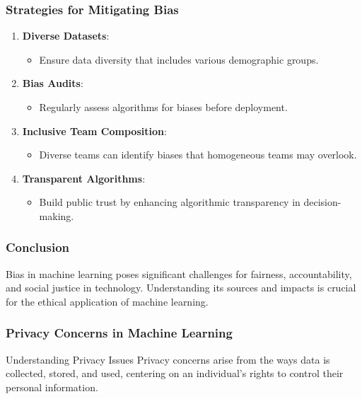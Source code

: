 \documentclass[aspectratio=169]{beamer}
\begin{document}
\begin{frame}[fragile]
    \frametitle{Strategies for Mitigating Bias}
    \begin{enumerate}
        \item \textbf{Diverse Datasets}:
        \begin{itemize}
            \item Ensure data diversity that includes various demographic groups.
        \end{itemize}

        \item \textbf{Bias Audits}:
        \begin{itemize}
            \item Regularly assess algorithms for biases before deployment.
        \end{itemize}

        \item \textbf{Inclusive Team Composition}:
        \begin{itemize}
            \item Diverse teams can identify biases that homogeneous teams may overlook.
        \end{itemize}

        \item \textbf{Transparent Algorithms}:
        \begin{itemize}
            \item Build public trust by enhancing algorithmic transparency in decision-making.
        \end{itemize}
    \end{enumerate}
\end{frame}

\begin{frame}[fragile]
    \frametitle{Conclusion}
    Bias in machine learning poses significant challenges for fairness, accountability, and social justice in technology. 
    Understanding its sources and impacts is crucial for the ethical application of machine learning.
\end{frame}

\begin{frame}[fragile]
    \frametitle{Privacy Concerns in Machine Learning}
    \begin{block}{Understanding Privacy Issues}
    Privacy concerns arise from the ways data is collected, stored, and used, centering on an individual's rights to control their personal information.
    \end{block}
\end{frame}
\end{document}
